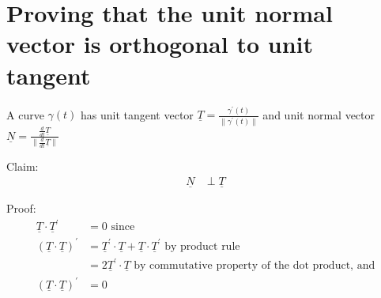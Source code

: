 \section{Proving that the unit normal vector is orthogonal to unit tangent}
\begin{framed}
   A curve $ \gamma(t)$ has unit tangent vector $ \underline{T} = \frac{ \gamma ^{\prime}(t)}{ \lVert \gamma ^{\prime}(t) \rVert } $ and unit normal vector $ \underline{N} = \frac{ \frac{d}{dt} \underline{T}}{ \lVert \frac{d}{dt} \underline{T} \rVert }$ 

   Claim:
   \begin{align*}
      \underline{N} &\perp \underline{T}
   \end{align*}
   

   Proof:
   \begin{align*}
      \underline{T} \cdot \underline{T} ^{\prime} &= 0 \text{ since } \\
      \left( \underline{T} \cdot \underline{T} \right) ^{\prime} &= \underline{T} ^{\prime} \cdot \underline{T} + \underline{T} \cdot \underline{T} ^{\prime} \text{ by product rule}\\
                                                                 &= 2 \underline{T} ^{\prime} \cdot \underline{T} \text{ by commutative property of the dot product, and} \\ 
      \left( \underline{T} \cdot \underline{T} \right) ^{\prime} &= 0
   \end{align*}
\end{framed}


